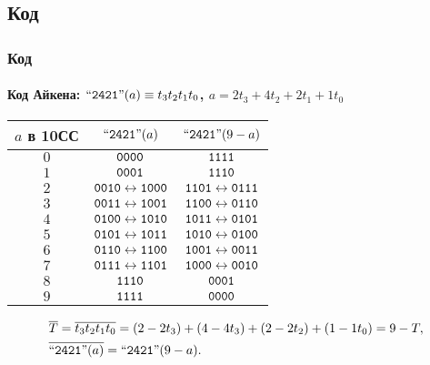 \subsection{Код \AikenLabel}


\begin{frame}
    \frametitle{Код \AikenLabel}
    \framesubtitle{Код Айкена: $\text{``\texttt{2421}''}(a)\equiv t_{3}t_{2}t_{1}t_{0}$, $a=2t_{3}+4t_{2}+2t_{1}+1t_{0}$}
    
    \begin{center}
    \begin{tabular}{|c|c|c|}
        \hline\hline
        $a$ в 10СС  & $\text{``\texttt{2421}''}(a)$                                   & $\text{``\texttt{2421}''}(9-a)$\\
        \hline\hline
        $0$         & $\texttt{0000}$                               & $\texttt{1111}$ \\
        $1$         & $\texttt{0001}$                               & $\texttt{1110}$ \\
        $2$         & $\texttt{0010}\leftrightarrow\texttt{1000}$   & $\texttt{1101}\leftrightarrow\texttt{0111}$ \\
        $3$         & $\texttt{0011}\leftrightarrow\texttt{1001}$   & $\texttt{1100}\leftrightarrow\texttt{0110}$ \\
        $4$         & $\texttt{0100}\leftrightarrow\texttt{1010}$   & $\texttt{1011}\leftrightarrow\texttt{0101}$ \\
        $5$         & $\texttt{0101}\leftrightarrow\texttt{1011}$   & $\texttt{1010}\leftrightarrow\texttt{0100}$ \\
        $6$         & $\texttt{0110}\leftrightarrow\texttt{1100}$   & $\texttt{1001}\leftrightarrow\texttt{0011}$ \\
        $7$         & $\texttt{0111}\leftrightarrow\texttt{1101}$   & $\texttt{1000}\leftrightarrow\texttt{0010}$ \\
        $8$         & $\texttt{1110}$                               & $\texttt{0001}$ \\
        $9$         & $\texttt{1111}$                               & $\texttt{0000}$ \\
        \hline
    \end{tabular}
    \end{center}
    
    \begin{align*}
        &\overline{T}=\overline{t_{3}t_{2}t_{1}t_{0}}=(2-2t_3) + (4-4t_3) + (2-2t_2) + (1-1t_0)=9-T,\\
        &\overline{\text{``\texttt{2421}''}(a)} = \text{``\texttt{2421}''}(9-a).
    \end{align*}
\end{frame}

